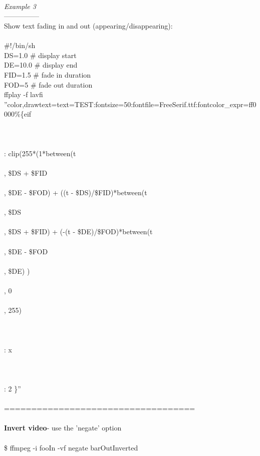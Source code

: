 \documentclass[10pt,a4paper]{article}
\begin{document}
{{{{{{{{{{{{{{\\
\\
\\
\textit{Example 3}}{\Large \\
---------------\\
Show text fading in and out (appearing/disappearing): \\
\\
\#!/bin/sh\\
DS=1.0 \# display start\\
DE=10.0 \# display end\\
FID=1.5 \# fade in duration\\
FOD=5 \# fade out duration\\
ffplay -f lavfi ''color,drawtext=text=TEST:fontsize=50:fontfile=FreeSerif.ttf:fontcolor\_expr=ff0000\%\{eif\\\\\\\\: clip(255*(1*between(t\\\\, \$DS + \$FID\\\\, \$DE - \$FOD) + ((t - \$DS)/\$FID)*between(t\\\\, \$DS\\\\, \$DS + \$FID) + (-(t - \$DE)/\$FOD)*between(t\\\\, \$DE - \$FOD\\\\, \$DE) )\\\\, 0\\\\, 255) \\\\\\\\: x\\\\\\\\: 2 \}''\\
\\
===================================\\
\\
\textbf{Invert video}}{\Large   - use the 'negate' option\\
\\
\$ ffmpeg -i fooIn -vf negate barOutInverted\\
}}}}}}}}}}}}}}
\end{document}
